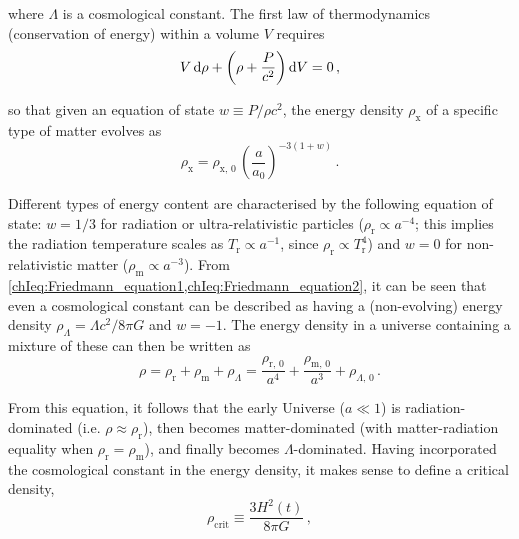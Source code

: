 \noindent where $\Lambda$ is a cosmological constant. The first law of thermodynamics (conservation of energy) within a volume $V$ requires
\begin{equation}
    \label{chIeq:First_law_thermodynamics}
    V \dif \rho + \left( \rho + \frac{P}{c^2} \right) \dif V = 0 \, ,
\end{equation}

\noindent so that given an equation of state $w \equiv P/\rho c^2$, the energy density $\rho_\text{x}$ of a specific type of matter evolves as
\begin{equation}
    \label{chIeq:Energy_density_scaling}
    \rho_\text{x} = \rho_{\text{x}, \, 0} \, \left( \frac{a}{a_0} \right)^{-3(1+w)} \, .
\end{equation}

Different types of energy content are characterised by the following equation of state: $w = 1/3$ for radiation or ultra-relativistic particles ($\rho_\text{r} \propto a^{-4}$; this implies the radiation temperature scales as $T_\text{r} \propto a^{-1}$, since $\rho_\text{r} \propto T_\text{r}^4$) and $w = 0$ for non-relativistic matter ($\rho_\text{m} \propto a^{-3}$). From \cref{chIeq:Friedmann_equation1,chIeq:Friedmann_equation2}, it can be seen that even a cosmological constant can be described as having a (non-evolving) energy density $\rho_\Lambda =\Lambda c^2/8 \pi G$ and $w = -1$. The energy density in a universe containing a mixture of these can then be written as
\begin{equation}
    \label{chIeq:Total_energy_density}
    \rho = \rho_\text{r} + \rho_\text{m} + \rho_\Lambda = \frac{\rho_{\text{r}, \, 0}}{a^4} + \frac{\rho_{\text{m}, \, 0}}{a^3} + \rho_{\Lambda, \, 0} \, .
\end{equation}

From this equation, it follows that the early Universe ($a \ll 1$) is radiation-dominated (i.e. $\rho \approx \rho_\text{r}$), then becomes matter-dominated (with matter-radiation equality when $\rho_\text{r} = \rho_\text{m}$), and finally becomes $\Lambda$-dominated. Having incorporated the cosmological constant in the energy density, it makes sense to define a critical density,
\begin{equation}
    \label{chIeq:Critical_density}
    \rho_\text{crit} \equiv \frac{3 H^2(t)}{8 \pi G} \, ,
\end{equation}

